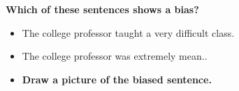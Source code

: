 \documentclass[12pt]{article}
\begin{document}
\begin{tcolorbox}[colframe=black!60, colback=white, 
coltitle=black, colbacktitle=black!15, fonttitle=\bfseries\Large, 
title=Exit Ticket, halign title=center, left=10pt, right=10pt, top=5pt, bottom=15pt]
\textbf{Which of these sentences shows a bias?}

\begin{itemize}

\item The college professor taught a very difficult class.
\item The college professor was extremely mean..
\item \textbf{Draw a picture of the biased sentence.}

\end{itemize}

\vspace{14em}

\end{tcolorbox}
\end{document}
